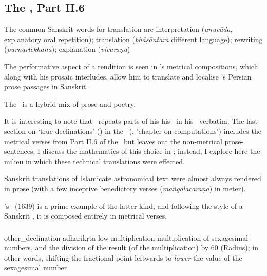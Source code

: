 \subsection{The \Siddhantasindhu, Part II.6}
\label{chapter_six_zij_sindhu_comparision}



The common Sanskrit words for translation are 
interpretation (\textit{anuvāda}, \lit explanatory oral repetition); translation (\textit{bhāṣāntara} \lit different language); rewriting (\textit{purnarlekhana}); explanation (\textit{vivaraṇa})


The performative aspect of a rendition is seen in \Nityananda's metrical compositions, which along with his prosaic interludes, allow him to translate and localise \MullaFarid's Persian prose passages in Sanskrit.   

The \Siddhantasindhu\ is a hybrid mix of prose and poetry. 

It is interesting to note that \Nityananda\ repeats parts of his his \Siddhantasindhu\ in his \Sarvasiddhantaraja\ verbatim. The last section on `true declinations' (\spastakrantyadhikara) in the \Sarvasiddhantaraja\ (\ganitadhyaya, 'chapter on computations') includes the metrical verses from Part II.6 of the \Siddhantasindhu\  but leaves out the non-metrical prose-sentences. I discuss the mathematics of this choice in \textcite[forthcoming]{MisraTD}; instead, I explore here the milieu in which these technical translations were effected.   
 
 
Sanskrit translations of Islamicate astronomical text were almost always rendered in prose (with a few inceptive benedictory verses (\textit{maṅgalācaraṇa}) in meter).

\Nityananda's \Sarvasiddhantaraja\ (1639) is a prime example of the latter kind, and following the style of a Sanskrit \siddhanta, it is composed entirely in metrical verses.

\subsubsection{}\label{structure_chapter_six}

\gls{other_declination} 
adharikṛtā \label{adharikrta_discussion}
low multiplication
multiplication of sexagesimal numbers, and the division of the result (of the multiplication) by 60 (Radius); in other words, shifting the fractional point leftwards to \textit{lower} the value of the sexagesimal number

